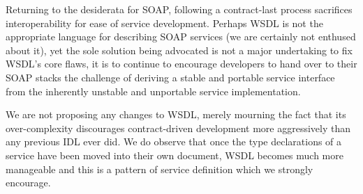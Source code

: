 Returning to the desiderata for SOAP, following a contract-last process
sacrifices interoperability for ease of service development. Perhaps
WSDL is not the appropriate language for describing SOAP services (we
are certainly not enthused about it), yet the sole solution being
advocated is not a major undertaking to fix WSDL's core flaws, it is
to continue to encourage developers to hand over to their SOAP stacks
the challenge of deriving a stable and portable service interface from
the inherently unstable and unportable service implementation.

We are not proposing any changes to WSDL, merely mourning the fact
that its over-complexity discourages contract-driven
development more aggressively than any previous IDL ever did. We do
observe that once the type declarations of a service have been moved
into their own document, WSDL becomes much more manageable and this is
a pattern of service definition which we strongly encourage.
